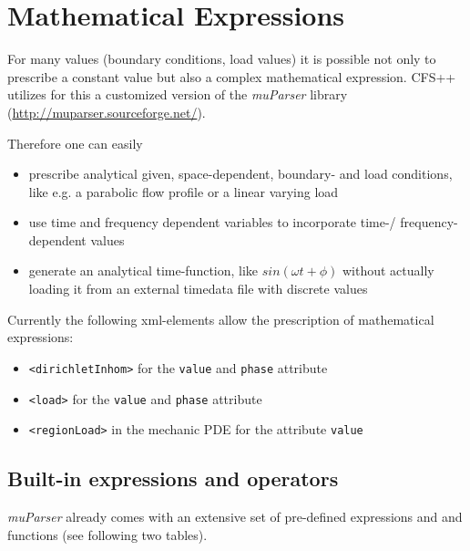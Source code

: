 \chapter{Mathematical Expressions}
For many values (boundary conditions, load values) it is possible not
only to prescribe a constant value but also a complex mathematical
expression. CFS++ utilizes for this a customized version of the {\em
  muParser} library (\url{http://muparser.sourceforge.net/}).

\noindent
Therefore one can easily
\begin{itemize}
\item prescribe analytical given, space-dependent, boundary- and load
  conditions, like e.g. a parabolic flow profile or a linear varying load
\item use time and frequency dependent variables to incorporate time-/
  frequency-dependent values
\item generate an analytical time-function, like $sin(\omega t
  + \phi)$ without actually loading it from an external timedata file
  with discrete values
\end{itemize}

\noindent
Currently the following xml-elements allow the prescription of mathematical
expressions:
\begin{itemize}
\item \verb#<dirichletInhom># for the \verb#value# and \verb#phase# attribute
\item \verb#<load># for the \verb#value# and \verb#phase# attribute
\item \verb#<regionLoad># in the mechanic PDE for the attribute \verb#value#
\end{itemize}

\section{Built-in expressions and operators}
{\em muParser} already comes with an extensive set of pre-defined
expressions and and functions (see following two tables).

